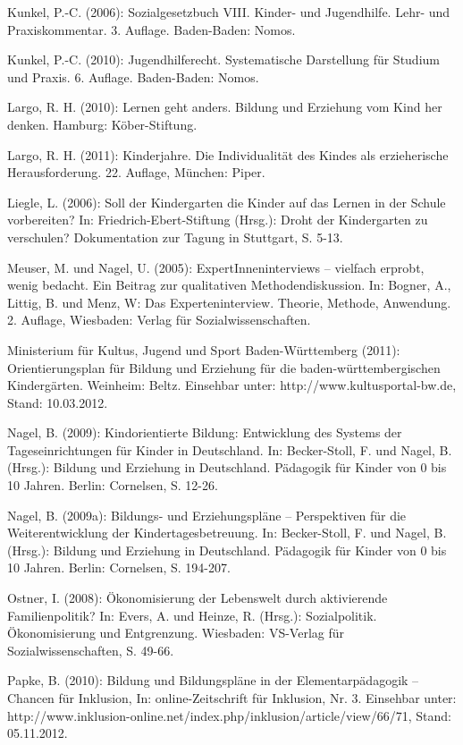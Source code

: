 Kunkel, P.-C. (2006): Sozialgesetzbuch VIII. Kinder- und Jugendhilfe. Lehr- und Praxiskommentar. 3. Auflage. Baden-Baden: Nomos. 

Kunkel, P.-C. (2010): Jugendhilferecht. Systematische Darstellung für Studium und Praxis. 6. Auflage. Baden-Baden: Nomos. 

Largo, R. H. (2010): Lernen geht anders. Bildung und Erziehung vom Kind her denken. Hamburg: Köber-Stiftung. 

Largo, R. H. (2011): Kinderjahre. Die Individualität des Kindes als erzieherische Herausforderung. 22. Auflage, München: Piper.

Liegle, L. (2006): Soll der Kindergarten die Kinder auf das Lernen in der Schule vorbereiten? In: Friedrich-Ebert-Stiftung (Hrsg.): Droht der Kindergarten zu verschulen? Dokumentation zur Tagung in Stuttgart, S. 5-13.

Meuser, M. und Nagel, U. (2005): ExpertInneninterviews – vielfach erprobt, wenig bedacht. Ein Beitrag zur qualitativen Methodendiskussion. In: Bogner, A., Littig, B. und Menz, W: Das Experteninterview. Theorie, Methode, Anwendung. 2. Auflage, Wiesbaden: Verlag für Sozialwissenschaften.

Ministerium für Kultus, Jugend und Sport Baden-Württemberg (2011): Orientierungsplan für Bildung und Erziehung für die baden-württembergischen Kindergärten. Weinheim: Beltz. Einsehbar unter: http://www.kultusportal-bw.de, Stand: 10.03.2012.

Nagel, B. (2009): Kindorientierte Bildung: Entwicklung des Systems der Tageseinrichtungen für Kinder in Deutschland. In: Becker-Stoll, F. und Nagel, B. (Hrsg.): Bildung und Erziehung in Deutschland. Pädagogik für Kinder von 0 bis 10 Jahren. Berlin: Cornelsen, S. 12-26.

Nagel, B. (2009a): Bildungs- und Erziehungspläne – Perspektiven für die Weiterentwicklung der Kindertagesbetreuung. In: Becker-Stoll, F. und Nagel, B. (Hrsg.): Bildung und Erziehung in Deutschland. Pädagogik für Kinder von 0 bis 10 Jahren. Berlin: Cornelsen, S. 194-207.

Ostner, I. (2008): Ökonomisierung der Lebenswelt durch aktivierende Familienpolitik? In: Evers, A. und Heinze, R. (Hrsg.): Sozialpolitik. Ökonomisierung und Entgrenzung. Wiesbaden: VS-Verlag für Sozialwissenschaften, S. 49-66.

Papke, B. (2010): Bildung und Bildungspläne in der Elementarpädagogik – Chancen für Inklusion, In: online-Zeitschrift für Inklusion, Nr. 3. Einsehbar unter: http://www.inklusion-online.net/index.php/inklusion/article/view/66/71, Stand: 05.11.2012.

